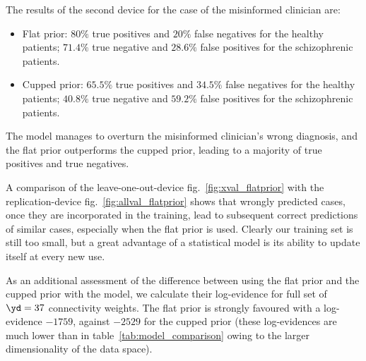 The results of the second device for the case of the misinformed clinician
are:
\begin{itemize}
\item Flat prior: $80\%$ true positives and $20\%$ false negatives for
  the healthy patients; $71.4\%$ true negative and $28.6\%$ false positives
  for the schizophrenic patients.
\item Cupped prior: $65.5\%$ true positives and $34.5\%$ false
  negatives for the healthy patients; $40.8\%$ true negative and $59.2\%$
  false positives for the schizophrenic patients.
\end{itemize}
The model manages to overturn the misinformed clinician's wrong diagnosis,
and the flat prior outperforms the cupped prior, leading to a majority
of true positives and true negatives.

A comparison of the leave-one-out-device
fig.~\ref{fig:xval_flatprior} with the
replication-device
fig.~\ref{fig:allval_flatprior} shows that
wrongly predicted cases, once they are incorporated in the training, lead
to subsequent correct predictions of similar cases, especially when the
flat prior is used. Clearly our training set is still too small, but a
great advantage of a statistical model is its ability to update itself at
every new use.


As an additional assessment of the difference between using the flat prior
and the cupped prior with the model, we calculate their log-evidence
for full set of $\yd=37$ connectivity weights. The flat prior is strongly
favoured with a log-evidence $-1759$, against $-2529$ for the cupped
prior (these log-evidences are much lower than in
table~\ref{tab:model_comparison} owing to the larger dimensionality of the
data space). 



